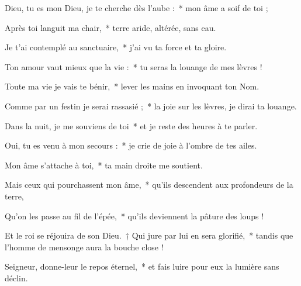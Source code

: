 \item Dieu, tu es mon Dieu, je te cherche dès l'aube :~* mon âme a soif de toi ;

\item Après toi languit ma chair,~* terre aride, altérée, sans eau.

\item Je t'ai contemplé au sanctuaire,~* j'ai vu ta force et ta gloire.

\item Ton amour vaut mieux que la vie :~* tu seras la louange de mes lèvres !

\item Toute ma vie je vais te bénir,~* lever les mains en invoquant ton Nom.

\item Comme par un festin je serai rassasié ;~* la joie sur les lèvres, je dirai ta louange.

\item Dans la nuit, je me souviens de toi~* et je reste des heures à te parler.

\item Oui, tu es venu à mon secours :~* je crie de joie à l'ombre de tes ailes.

\item Mon âme s'attache à toi,~* ta main droite me soutient.

\item Mais ceux qui pourchassent mon âme,~* qu'ils descendent aux profondeurs de la terre,

\item Qu'on les passe au fil de l'épée,~* qu'ils deviennent la pâture des loups !

\item Et le roi se réjouira de son Dieu.~† Qui jure par lui en sera glorifié,~* tandis que l'homme de mensonge aura la bouche close !

\item Seigneur, donne-leur le repos éternel,~* et fais luire pour eux la lumière sans déclin.